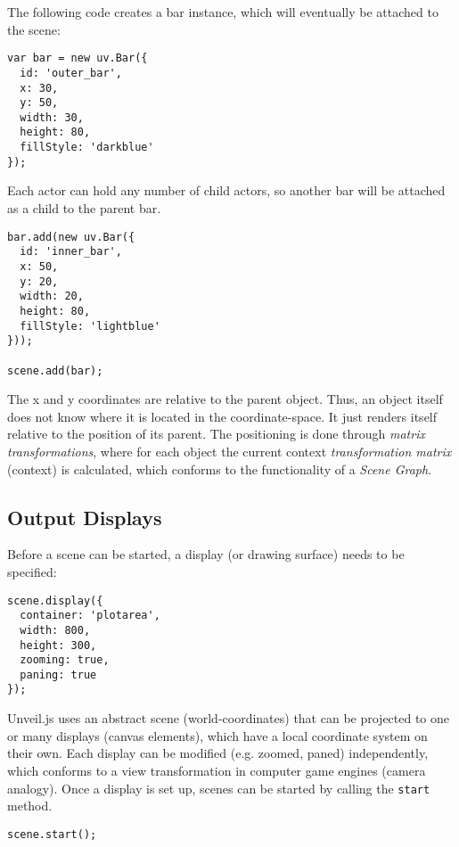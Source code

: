 \begin{english}
\SuperPar The following code creates a bar instance, which will eventually be attached to the scene:

\begin{verbatim}
var bar = new uv.Bar({
  id: 'outer_bar',
  x: 30,
  y: 50,
  width: 30,
  height: 80,
  fillStyle: 'darkblue'
});
\end{verbatim}

\SuperPar Each actor can hold any number of child actors, so another bar will be attached as a child to the parent bar.

\begin{verbatim}
bar.add(new uv.Bar({
  id: 'inner_bar',
  x: 50,
  y: 20,
  width: 20,
  height: 80,
  fillStyle: 'lightblue'
}));

scene.add(bar);
\end{verbatim}

\SuperPar The x and y coordinates are relative to the parent object. Thus, an object itself does not know where it is located in the coordinate-space. It just renders itself relative to the position of its parent. The positioning is done through \emph{matrix transformations}, where for each object the current context \emph{transformation matrix} (context) is calculated, which conforms to the functionality of a \emph{Scene Graph}.

\subsection{Output Displays}

Before a scene can be started, a display (or drawing surface) needs to be specified:

\begin{verbatim}
scene.display({
  container: 'plotarea',
  width: 800,
  height: 300,
  zooming: true,
  paning: true
});
\end{verbatim}

\SuperPar Unveil.js uses an abstract scene (world-coordinates) that can be projected to one or many displays (canvas elements), which have a local coordinate system on their own. Each display can be modified (e.g. zoomed, paned) independently, which conforms to a view transformation in computer game engines (camera analogy). Once a display is set up, scenes can be started by calling the \texttt{start} method.

\begin{verbatim}
scene.start();
\end{verbatim}


\end{english}

